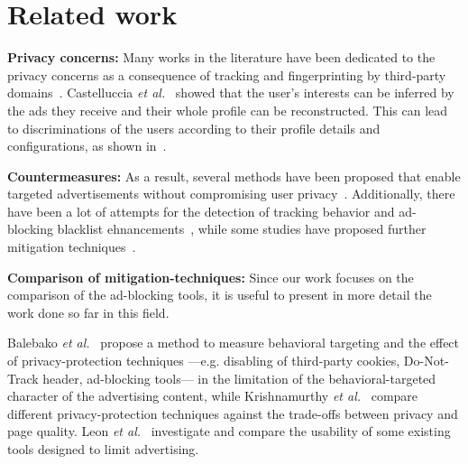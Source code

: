 \documentclass[compsoc, conference, letterpaper, 10pt, times]{IEEEtran}
\begin{document}

\section{Related work}
\label{sec:related_work}


\textbf{Privacy concerns:} Many works in the literature have been dedicated to the privacy concerns as a consequence of tracking and fingerprinting by third-party domains~\cite{barford, englehardt, krishnamurthy_privacy_diffusion, nikiforakis, soltani, libert2015exposing}. Castelluccia \textit{et al.}~\cite{castelluccia} showed that the user's interests can be inferred by the ads they receive and their whole profile can be reconstructed. This can lead to discriminations of the users according to their profile details and configurations, as shown in~\cite{mikians, datta}.

\textbf{Countermeasures:} As a result, several methods have been proposed that enable targeted advertisements without compromising user privacy~\cite{adnostic, privad, nurikabe, haddadi, juels, androulaki}. Additionally, there have been a lot of attempts for the detection of tracking behavior and ad-blocking blacklist ehnancements~\cite{ma, gugelmann, tran}, while some studies have proposed further mitigation techniques~\cite{roesner, kontaxis}.

\textbf{Comparison of mitigation-techniques:} Since our work focuses on the comparison of the ad-blocking tools, it is useful to present in more detail the work done so far in this field.

Balebako \textit{et al.}~\cite{balebako} propose a method to measure behavioral targeting and the effect of privacy-protection techniques ---e.g. disabling of third-party cookies, Do-Not-Track header, ad-blocking tools--- in the limitation of the behavioral-targeted character of the advertising content, while Krishnamurthy \textit{et al.}~\cite{krishnamurthy_measuring_privacy_loss} compare different privacy-protection techniques against the trade-offs between privacy and page quality. Leon \textit{et al.}~\cite{leon} investigate and compare the usability of some existing tools designed to limit advertising.
\end{document}
